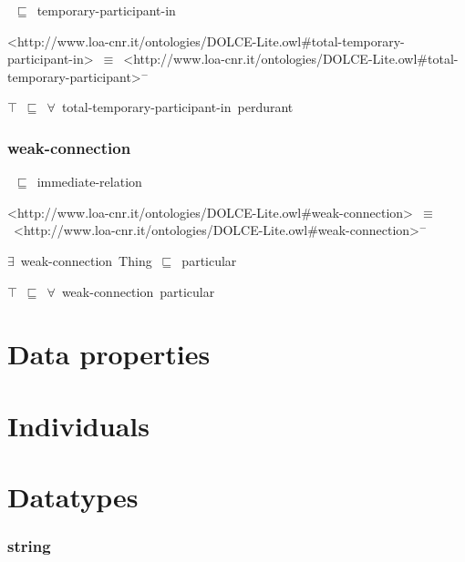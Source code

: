\documentclass{article}
\begin{document}
~\ensuremath{\sqsubseteq}~temporary-participant-in

<http://www.loa-cnr.it/ontologies/DOLCE-Lite.owl#total-temporary-participant-in>~\ensuremath{\equiv}~<http://www.loa-cnr.it/ontologies/DOLCE-Lite.owl#total-temporary-participant>\ensuremath{^-}

\ensuremath{\top}~\ensuremath{\sqsubseteq}~\ensuremath{\forall}~total-temporary-participant-in~perdurant

\subsubsection*{weak-connection}

~\ensuremath{\sqsubseteq}~immediate-relation

<http://www.loa-cnr.it/ontologies/DOLCE-Lite.owl#weak-connection>~\ensuremath{\equiv}~<http://www.loa-cnr.it/ontologies/DOLCE-Lite.owl#weak-connection>\ensuremath{^-}

\ensuremath{\exists}~weak-connection~Thing~\ensuremath{\sqsubseteq}~particular

\ensuremath{\top}~\ensuremath{\sqsubseteq}~\ensuremath{\forall}~weak-connection~particular

\section*{Data properties}\section*{Individuals}\section*{Datatypes}\subsubsection*{string}
\end{document}
